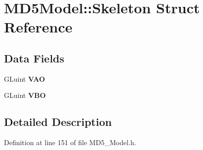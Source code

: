 \hypertarget{struct_m_d5_model_1_1_skeleton}{}\section{M\+D5\+Model\+:\+:Skeleton Struct Reference}
\label{struct_m_d5_model_1_1_skeleton}
\subsection*{Data Fields}
\begin{DoxyCompactItemize}
\item 
G\+Luint {\bfseries V\+AO}\hypertarget{struct_m_d5_model_1_1_skeleton_a0b8ef5e865ce6ddca5f260a9880d22c7}{}\label{struct_m_d5_model_1_1_skeleton_a0b8ef5e865ce6ddca5f260a9880d22c7}

\item 
G\+Luint {\bfseries V\+BO}\hypertarget{struct_m_d5_model_1_1_skeleton_af07da614453b472e5fba4c9868ed6b47}{}\label{struct_m_d5_model_1_1_skeleton_af07da614453b472e5fba4c9868ed6b47}

\end{DoxyCompactItemize}


\subsection{Detailed Description}


Definition at line 151 of file M\+D5\+\_\+\+Model.\+h.

